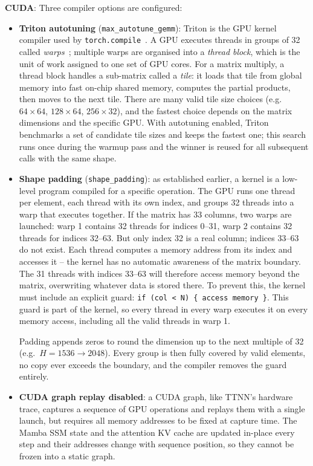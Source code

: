 \textbf{CUDA}: Three compiler options are configured:
\begin{itemize}
  \item \textbf{Triton autotuning} (\texttt{max\_autotune\_gemm}): Triton is the GPU kernel compiler used by \texttt{torch.compile}~\citep{pytorch_compile}. A GPU executes threads in groups of 32 called \emph{warps}~\citep{nvidia_cudaprog}; multiple warps are organised into a \emph{thread block}, which is the unit of work assigned to one set of GPU cores. For a matrix multiply, a thread block handles a sub-matrix called a \emph{tile}: it loads that tile from global memory into fast on-chip shared memory, computes the partial products, then moves to the next tile. There are many valid tile size choices (e.g.\ $64{\times}64$, $128{\times}64$, $256{\times}32$), and the fastest choice depends on the matrix dimensions and the specific GPU. With autotuning enabled, Triton benchmarks a set of candidate tile sizes and keeps the fastest one; this search runs once during the warmup pass and the winner is reused for all subsequent calls with the same shape.

  \item \textbf{Shape padding} (\texttt{shape\_padding}): as established earlier, a kernel is a low-level program compiled for a specific operation. The GPU runs one thread per element, each thread with its own index, and groups 32 threads into a warp that executes together. If the matrix has 33 columns, two warps are launched: warp 1 contains 32 threads for indices 0--31, warp 2 contains 32 threads for indices 32--63. But only index 32 is a real column; indices 33--63 do not exist. Each thread computes a memory address from its index and accesses it -- the kernel has no automatic awareness of the matrix boundary. The 31 threads with indices 33--63 will therefore access memory beyond the matrix, overwriting whatever data is stored there. To prevent this, the kernel must include an explicit guard: \texttt{if (col < N) \{ access memory \}}. This guard is part of the kernel, so every thread in every warp executes it on every memory access, including all the valid threads in warp 1.

  Padding appends zeros to round the dimension up to the next multiple of 32 (e.g.\ $H{=}1536 \to 2048$). Every group is then fully covered by valid elements, no copy ever exceeds the boundary, and the compiler removes the guard entirely.

  \item \textbf{CUDA graph replay disabled}: a CUDA graph, like TTNN's hardware trace, captures a sequence of GPU operations and replays them with a single launch, but requires all memory addresses to be fixed at capture time. The Mamba SSM state and the attention KV cache are updated in-place every step and their addresses change with sequence position, so they cannot be frozen into a static graph.
\end{itemize}

